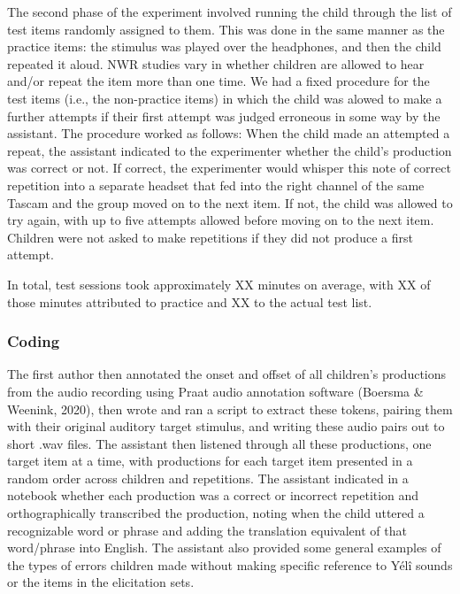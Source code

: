 \documentclass[english,,man,floatsintext]{apa6}
\begin{document}
The second phase of the experiment involved running the child through
the list of test items randomly assigned to them. This was done in the
same manner as the practice items: the stimulus was played over the
headphones, and then the child repeated it aloud. NWR studies vary in
whether children are allowed to hear and/or repeat the item more than
one time. We had a fixed procedure for the test items (i.e., the
non-practice items) in which the child was alowed to make a further
attempts if their first attempt was judged erroneous in some way by the
assistant. The procedure worked as follows: When the child made an
attempted a repeat, the assistant indicated to the experimenter whether
the child's production was correct or not. If correct, the experimenter
would whisper this note of correct repetition into a separate headset
that fed into the right channel of the same Tascam and the group moved
on to the next item. If not, the child was allowed to try again, with up
to five attempts allowed before moving on to the next item. Children
were not asked to make repetitions if they did not produce a first
attempt.

In total, test sessions took approximately XX minutes on average, with
XX of those minutes attributed to practice and XX to the actual test
list.

\subsubsection{Coding}\label{coding}

The first author then annotated the onset and offset of all children's
productions from the audio recording using Praat audio annotation
software (Boersma \& Weenink, 2020), then wrote and ran a script to
extract these tokens, pairing them with their original auditory target
stimulus, and writing these audio pairs out to short .wav files. The
assistant then listened through all these productions, one target item
at a time, with productions for each target item presented in a random
order across children and repetitions. The assistant indicated in a
notebook whether each production was a correct or incorrect repetition
and orthographically transcribed the production, noting when the child
uttered a recognizable word or phrase and adding the translation
equivalent of that word/phrase into English. The assistant also provided
some general examples of the types of errors children made without
making specific reference to Yélî sounds or the items in the elicitation
sets.
\end{document}
